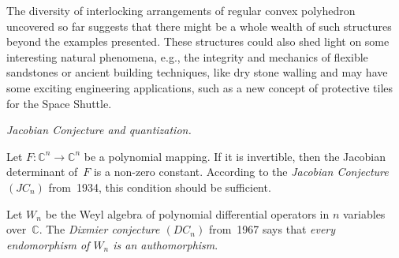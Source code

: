 


The diversity of interlocking arrangements of regular convex polyhedron
uncovered so far suggests that there might be a whole wealth of such structures
beyond the examples presented. These structures
could
also shed light on some interesting natural phenomena, e.g., the integrity and
mechanics of flexible sandstones or ancient building techniques, like dry stone
walling and may have some exciting engineering applications, such as a new
concept of protective tiles for the Space Shuttle.

\smallskip

{\sl Jacobian Conjecture and quantization.}

Let $F: {\mathbb C}^n\to {\mathbb C}^n$ be a polynomial mapping. If it is
invertible, then the Jacobian determinant of~$F$ is a non-zero constant.
According to the {\sl Jacobian Conjecture $(JC_n)$} from~1934, this condition
should be sufficient.

Let $W_n$ be the Weyl algebra of polynomial differential operators in $n$
variables over~${\mathbb C}$. The {\sl Dixmier conjecture $(DC_n)$} from~1967
says that {\it every endomorphism of $W_n$ is an authomorphism}.

